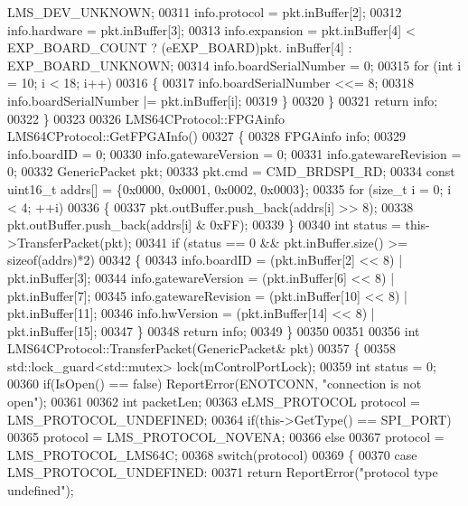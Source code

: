 \begin{DoxyCode}
      LMS_DEV_UNKNOWN;
00311         info.protocol = pkt.inBuffer[2];
00312         info.hardware = pkt.inBuffer[3];
00313         info.expansion = pkt.inBuffer[4] < EXP_BOARD_COUNT ? (eEXP_BOARD)pkt.
      inBuffer[4] : EXP_BOARD_UNKNOWN;
00314         info.boardSerialNumber = 0;
00315         \textcolor{keywordflow}{for} (\textcolor{keywordtype}{int} i = 10; i < 18; i++)
00316         \{
00317             info.boardSerialNumber <<= 8;
00318             info.boardSerialNumber |= pkt.inBuffer[i];
00319         \}
00320     \}
00321     \textcolor{keywordflow}{return} info;
00322 \}
00323 
00326 LMS64CProtocol::FPGAinfo LMS64CProtocol::GetFPGAInfo()
00327 \{
00328     FPGAinfo info;
00329     info.boardID = 0;
00330     info.gatewareVersion = 0;
00331     info.gatewareRevision = 0;
00332     GenericPacket pkt;
00333     pkt.cmd = CMD_BRDSPI_RD;
00334     \textcolor{keyword}{const} uint16\_t addrs[] = \{0x0000, 0x0001, 0x0002, 0x0003\};
00335     \textcolor{keywordflow}{for} (\textcolor{keywordtype}{size\_t} i = 0; i < 4; ++i)
00336     \{
00337         pkt.outBuffer.push\_back(addrs[i] >> 8);
00338         pkt.outBuffer.push\_back(addrs[i] & 0xFF);
00339     \}
00340     \textcolor{keywordtype}{int} status = this->TransferPacket(pkt);
00341     \textcolor{keywordflow}{if} (status == 0 && pkt.inBuffer.size() >= \textcolor{keyword}{sizeof}(addrs)*2)
00342     \{
00343         info.boardID = (pkt.inBuffer[2] << 8) | pkt.inBuffer[3];
00344         info.gatewareVersion = (pkt.inBuffer[6] << 8) | pkt.inBuffer[7];
00345         info.gatewareRevision = (pkt.inBuffer[10] << 8) | pkt.inBuffer[11];
00346         info.hwVersion = (pkt.inBuffer[14] << 8) | pkt.inBuffer[15];
00347     \}
00348     \textcolor{keywordflow}{return} info;
00349 \}
00350 
00351 
00356 \textcolor{keywordtype}{int} LMS64CProtocol::TransferPacket(GenericPacket& pkt)
00357 \{
00358     std::lock\_guard<std::mutex> lock(mControlPortLock);
00359     \textcolor{keywordtype}{int} status = 0;
00360     \textcolor{keywordflow}{if}(IsOpen() == \textcolor{keyword}{false}) ReportError(ENOTCONN, \textcolor{stringliteral}{"connection is not open"});
00361 
00362     \textcolor{keywordtype}{int} packetLen;
00363     eLMS_PROTOCOL protocol = LMS_PROTOCOL_UNDEFINED;
00364     \textcolor{keywordflow}{if}(this->GetType() == SPI_PORT)
00365         protocol = LMS_PROTOCOL_NOVENA;
00366     \textcolor{keywordflow}{else}
00367         protocol = LMS_PROTOCOL_LMS64C;
00368     \textcolor{keywordflow}{switch}(protocol)
00369     \{
00370     \textcolor{keywordflow}{case} LMS_PROTOCOL_UNDEFINED:
00371         \textcolor{keywordflow}{return} ReportError(\textcolor{stringliteral}{"protocol type undefined"});

\end{DoxyCode}

